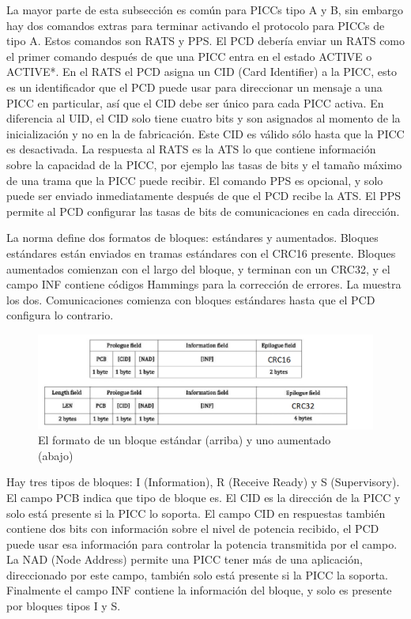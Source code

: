 \documentclass[a4paper, twoside, 11pt]{report}
\begin{document}
La mayor parte de esta subsección es común para PICCs tipo A y B, sin embargo hay dos comandos extras para terminar activando el protocolo para PICCs de tipo A. Estos comandos son RATS y PPS. El PCD debería enviar un RATS como el primer comando después de que una PICC entra en el estado ACTIVE o ACTIVE*. En el RATS el PCD asigna un CID (Card Identifier) a la PICC, esto es un identificador que el PCD puede usar para direccionar un mensaje a una PICC en particular, así que el CID debe ser único para cada PICC activa. En diferencia al UID, el CID solo tiene cuatro bits y son asignados  al momento de la inicialización y no en la  de fabricación. Este CID es válido sólo hasta que la PICC es desactivada. La respuesta al RATS es la ATS lo que contiene información sobre la capacidad de la PICC, por ejemplo las tasas de bits y el tamaño máximo de una trama que la PICC puede recibir. El comando PPS es opcional, y solo puede ser enviado inmediatamente después de que el PCD recibe la ATS. El PPS permite al PCD configurar las tasas de bits de comunicaciones en cada dirección.

La norma define dos formatos de bloques: estándares y aumentados. Bloques estándares están enviados en tramas estándares con el CRC16 presente. Bloques aumentados comienzan con el largo del bloque, y terminan con un CRC32, y el campo INF contiene códigos Hammings para la corrección de errores. La  muestra los dos. Comunicaciones comienza con bloques estándares hasta que el PCD configura lo contrario.

\begin{figure}[htb]
  \centering
  \includegraphics[scale=0.52]{./img/bloque_formats}
  \caption{El formato de un bloque estándar (arriba) y uno aumentado (abajo)~\cite{iso14443-4}}
  \label{fig:std_enhanced_blocks}
\end{figure}

Hay tres tipos de bloques: I (Information), R (Receive Ready) y S (Supervisory). El campo PCB indica que tipo de bloque es. El CID es la dirección de la PICC y solo está presente si la PICC lo soporta. El campo CID en respuestas también contiene dos bits con información sobre el nivel de potencia recibido, el PCD puede usar esa información para controlar la potencia transmitida por el campo. La NAD (Node Address) permite una PICC tener más de una aplicación, direccionado por este campo, también solo está presente si la PICC la soporta. Finalmente el campo INF contiene la información del bloque, y solo es presente por bloques tipos I y S.
\end{document}
